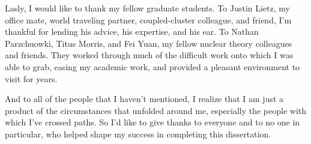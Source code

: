 \documentclass[../thesis.tex]{subfiles}
\begin{document}
Lasly, I would like to thank my fellow graduate students.  To Justin Lietz, my office mate, world traveling partner, coupled-cluster colleague, and friend, I'm thankful for lending his advice, his expertise, and his ear.  To Nathan Parzchuowki, Titus Morris, and Fei Yuan, my fellow nuclear theory colleagues and friends.  They worked through much of the difficult work onto which I was able to grab, easing my academic work, and provided a pleasant environment to visit for years.

And to all of the people that I haven't mentioned, I realize that I am just a product of the circumstances that unfolded around me, especially the people with which I've crossed paths.  So I'd like to give thanks to everyone and to no one in particular, who helped shape my success in completing this dissertation.
\end{document}
